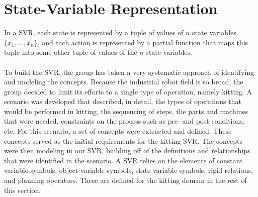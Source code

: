 \section{State-Variable Representation}
In a SVR, each state is represented by a tuple of values of $n$ state variables $\lbrace x_1,\dots,x_n\rbrace$, and each action is represented by a partial function that maps this tuple into some other tuple of values of the $n$ state variables.\\ \\
To build the SVR, the group has taken a very systematic approach of identifying and modeling the concepts. Because the industrial robot field is so broad, the group decided to limit its efforts to a single type of operation, namely kitting. A scenario was developed that described, in detail, the types of operations that would be performed in kitting, the sequencing of steps, the parts and machines that were needed, constraints on the process such as pre- and post-conditions, etc. For this scenario, a set of concepts were extracted and defined. These concepts served as the initial requirements for the kitting SVR. The concepts were then modeling in our SVR, building off of the definitions and relationships that were identified in the scenario. A SVR relies on the elements of constant variable symbols, object variable symbols, state variable symbols, rigid relations, and planning operators. These are defined for the kitting domain in the rest of this section.


